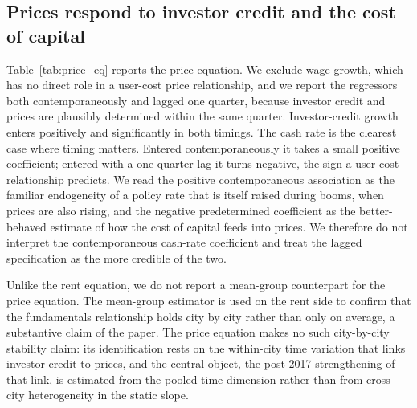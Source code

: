 \documentclass[preprint,11pt,authoryear]{elsarticle}
\begin{document}
\subsection{Prices respond to investor credit and the cost of capital}
\label{sec:price_eq}

Table~\ref{tab:price_eq} reports the price equation. We exclude wage growth, which
has no direct role in a user-cost price relationship, and we report the regressors
both contemporaneously and lagged one quarter, because investor credit and prices
are plausibly determined within the same quarter. Investor-credit growth enters
positively and significantly in both timings. The cash rate is the clearest case
where timing matters. Entered contemporaneously it takes a small positive
coefficient; entered with a one-quarter lag it turns negative, the
sign a user-cost relationship predicts. We read the positive contemporaneous
association as the familiar endogeneity of a policy rate that is itself raised
during booms, when prices are also rising, and the negative predetermined
coefficient as the better-behaved estimate of how the cost of capital feeds into
prices. We therefore do not interpret the contemporaneous cash-rate coefficient and
treat the lagged specification as the more credible of the two.

Unlike the rent equation, we do not report a mean-group counterpart for the
price equation. The mean-group estimator is used on the rent side to confirm
that the fundamentals relationship holds city by city rather than only on
average, a substantive claim of the paper. The price equation makes no such
city-by-city stability claim: its identification rests on the within-city time
variation that links investor credit to prices, and the central object, the
post-2017 strengthening of that link, is estimated from the pooled time
dimension rather than from cross-city heterogeneity in the static slope.
\end{document}
